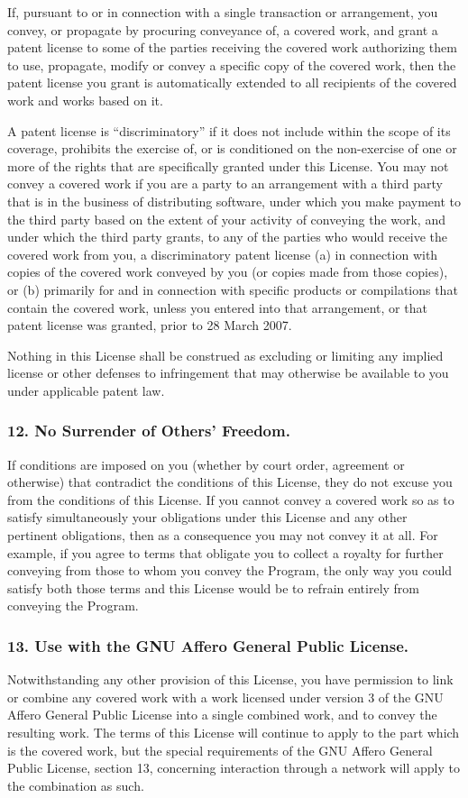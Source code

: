 If, pursuant to or in connection with a single transaction or arrangement, you convey, or propagate by procuring conveyance of, a covered work, and grant a patent license to some of the parties receiving the covered work authorizing them to use, propagate, modify or convey a specific copy of the covered work, then the patent license you grant is automatically extended to all recipients of the covered work and works based on it.\par
A patent license is “discriminatory” if it does not include within the scope of its coverage, prohibits the exercise of, or is conditioned on the non-exercise of one or more of the rights that are specifically granted under this License. You may not convey a covered work if you are a party to an arrangement with a third party that is in the business of distributing software, under which you make payment to the third party based on the extent of your activity of conveying the work, and under which the third party grants, to any of the parties who would receive the covered work from you, a discriminatory patent license (a) in connection with copies of the covered work conveyed by you (or copies made from those copies), or (b) primarily for and in connection with specific products or compilations that contain the covered work, unless you entered into that arrangement, or that patent license was granted, prior to 28 March 2007.\par
Nothing in this License shall be construed as excluding or limiting any implied license or other defenses to infringement that may otherwise be available to you under applicable patent law.
\subsubsection{12. No Surrender of Others' Freedom.}
If conditions are imposed on you (whether by court order, agreement or otherwise) that contradict the conditions of this License, they do not excuse you from the conditions of this License. If you cannot convey a covered work so as to satisfy simultaneously your obligations under this License and any other pertinent obligations, then as a consequence you may not convey it at all. For example, if you agree to terms that obligate you to collect a royalty for further conveying from those to whom you convey the Program, the only way you could satisfy both those terms and this License would be to refrain entirely from conveying the Program.
\subsubsection{13. Use with the GNU Affero General Public License.}
Notwithstanding any other provision of this License, you have permission to link or combine any covered work with a work licensed under version 3 of the GNU Affero General Public License into a single combined work, and to convey the resulting work. The terms of this License will continue to apply to the part which is the covered work, but the special requirements of the GNU Affero General Public License, section 13, concerning interaction through a network will apply to the combination as such.
